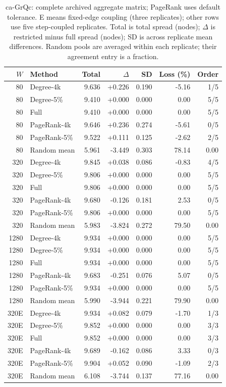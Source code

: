 \begin{table}[htbp]
\caption{ca-GrQc: complete archived aggregate matrix; PageRank uses default tolerance. E means fixed-edge coupling (three replicates); other rows use five step-coupled replicates. Total is total spread (nodes); $\Delta$ is restricted minus full spread (nodes); SD is across replicate mean differences. Random pools are averaged within each replicate; their agreement entry is a fraction.}\label{tab:s-ca_grqc}
\begin{tabular}{rlrrrrr}
\toprule
$W$ & Method & Total & $\Delta$ & SD & Loss (\%) & Order \\
\midrule
80 & Degree-4k & 9.636 & +0.226 & 0.190 & -5.16 & 1/5 \\
80 & Degree-5\% & 9.410 & +0.000 & 0.000 & 0.00 & 5/5 \\
80 & Full & 9.410 & +0.000 & 0.000 & 0.00 & 5/5 \\
80 & PageRank-4k & 9.646 & +0.236 & 0.274 & -5.61 & 0/5 \\
80 & PageRank-5\% & 9.522 & +0.111 & 0.125 & -2.62 & 2/5 \\
80 & Random mean & 5.961 & -3.449 & 0.303 & 78.14 & 0.00 \\
320 & Degree-4k & 9.845 & +0.038 & 0.086 & -0.83 & 4/5 \\
320 & Degree-5\% & 9.806 & +0.000 & 0.000 & 0.00 & 5/5 \\
320 & Full & 9.806 & +0.000 & 0.000 & 0.00 & 5/5 \\
320 & PageRank-4k & 9.680 & -0.126 & 0.181 & 2.53 & 0/5 \\
320 & PageRank-5\% & 9.806 & +0.000 & 0.000 & 0.00 & 5/5 \\
320 & Random mean & 5.983 & -3.824 & 0.272 & 79.50 & 0.00 \\
1280 & Degree-4k & 9.934 & +0.000 & 0.000 & 0.00 & 5/5 \\
1280 & Degree-5\% & 9.934 & +0.000 & 0.000 & 0.00 & 5/5 \\
1280 & Full & 9.934 & +0.000 & 0.000 & 0.00 & 5/5 \\
1280 & PageRank-4k & 9.683 & -0.251 & 0.076 & 5.07 & 0/5 \\
1280 & PageRank-5\% & 9.934 & +0.000 & 0.000 & 0.00 & 5/5 \\
1280 & Random mean & 5.990 & -3.944 & 0.221 & 79.90 & 0.00 \\
320E & Degree-4k & 9.934 & +0.082 & 0.079 & -1.70 & 1/3 \\
320E & Degree-5\% & 9.852 & +0.000 & 0.000 & 0.00 & 3/3 \\
320E & Full & 9.852 & +0.000 & 0.000 & 0.00 & 3/3 \\
320E & PageRank-4k & 9.689 & -0.162 & 0.086 & 3.33 & 0/3 \\
320E & PageRank-5\% & 9.904 & +0.052 & 0.090 & -1.09 & 2/3 \\
320E & Random mean & 6.108 & -3.744 & 0.137 & 77.16 & 0.00 \\
\bottomrule
\end{tabular}
\end{table}

